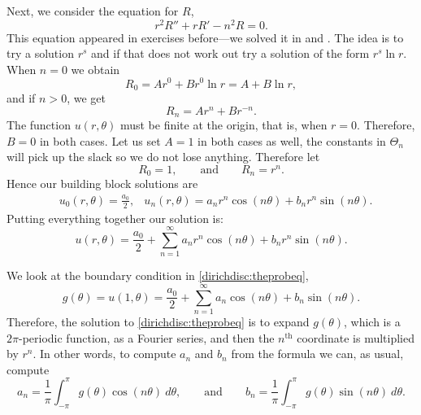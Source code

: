 Next, we consider the equation for $R$,
\begin{equation*}
r^2 R'' + r R' - n^2 R = 0.
\end{equation*}
This equation appeared in exercises before---we
solved it in 
and .  The idea is to try a solution
$r^s$ and if that does not work out try a solution of the form
$r^s \ln r$.  When $n=0$ we obtain
\begin{equation*}
R_0 = A r^0 + B r^0 \ln r = A + B \ln r ,
\end{equation*}
and if $n > 0$, we get
\begin{equation*}
R_n = A r^n + B r^{-n} .
\end{equation*}
The function $u(r,\theta)$ must be finite at the origin, that is, when $r=0$.
Therefore, $B=0$ in both
cases.  Let us set $A=1$ in both cases as well, the constants in $\Theta_n$
will pick up the slack so we do not lose anything.  Therefore let
\begin{equation*}
R_0 = 1 , \qquad \text{and} \qquad
R_n = r^n .
\end{equation*}
Hence our building block solutions are
\begin{align*}
& u_0(r,\theta) = \frac{a_0}{2} ,
& u_n(r,\theta) = a_n r^n \cos(n \theta) + b_n r^n \sin(n \theta) .
\end{align*}
Putting everything together our solution is:
\begin{equation*}
\boxed{~~
u(r,\theta)
=
\frac{a_0}{2} +
\sum_{n=1}^\infty
a_n r^n \cos(n \theta) + b_n r^n \sin(n \theta) .
~~}
\end{equation*}

We look at the boundary condition in \eqref{dirichdisc:theprobeq},
\begin{equation*}
g(\theta) = u(1,\theta)
=
\frac{a_0}{2} +
\sum_{n=1}^\infty
a_n \cos(n \theta) + b_n \sin(n \theta) .
\end{equation*}
Therefore, the solution to \eqref{dirichdisc:theprobeq}
is to expand $g(\theta)$, which is 
a $2\pi$-periodic function, as a Fourier series, and then 
the $n^{\text{th}}$ coordinate is multiplied by $r^n$.  In other words, to
compute $a_n$ and $b_n$ from the formula we can, as usual, compute
\begin{equation*}
a_n =
\frac{1}{\pi} \int_{-\pi}^\pi g(\theta) \cos (n\theta) ~ d\theta , \qquad
\text{and} \qquad
b_n =
\frac{1}{\pi} \int_{-\pi}^\pi g(\theta) \sin (n\theta) ~ d\theta.
\end{equation*}

